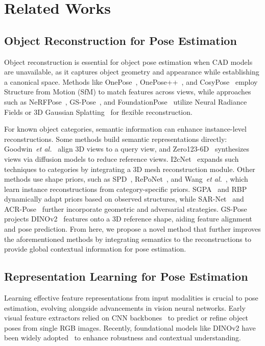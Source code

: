 \section{Related Works} \label{sec:related_works}
\subsection{Object Reconstruction for Pose Estimation}
Object reconstruction is essential for object pose estimation when CAD models are unavailable, as it captures object geometry and appearance while establishing a canonical space. Methods like OnePose~\cite{sun2022onepose}, OnePose++~\cite{he2022oneposeplusplus}, and CosyPose~\cite{labbe2020cosypose} employ Structure from Motion (SfM) to match features across views, while approaches such as NeRFPose~\cite{li2023nerf}, GS-Pose~\cite{cai2024gs}, and FoundationPose~\cite{wen2024foundationpose} utilize Neural Radiance Fields or 3D Gaussian Splatting~\cite{kerbl20233dgaussian} for flexible reconstruction.

For known object categories, semantic information can enhance instance-level reconstructions. Some methods build semantic representations directly: Goodwin~\textit{et al.}~\cite{goodwin2022zero} align 3D views to a query view, and Zero123-6D~\cite{di2024zero123} synthesizes views via diffusion models to reduce reference views. I2cNet~\cite{i2c} expands such techniques to categories by integrating a 3D mesh reconstruction module. Other methods use shape priors, such as SPD~\cite{tian2020shape}, RePoNet~\cite{fu2022category}, and Wang~\textit{et al.}~\cite{wang2021category}, which learn instance reconstructions from category-specific priors. SGPA~\cite{chen2021sgpa} and RBP~\cite{zhang2022rbp} dynamically adapt priors based on observed structures, while SAR-Net~\cite{sar} and ACR-Pose~\cite{fan2021acrpose} further incorporate geometric and adversarial strategies. GS-Pose~\cite{wang2025gs} projects DINOv2~\cite{oquab2023dinov2} features onto a 3D reference shape, aiding feature alignment and pose prediction. From here, we propose a novel method that further improves the aforementioned methods by integrating semantics to the reconstructions to provide global contextual information for pose estimation.

 
\subsection{Representation Learning for Pose Estimation}
Learning effective feature representations from input modalities is crucial to pose estimation, evolving alongside advancements in vision neural networks. Early visual feature extractors relied on CNN backbones~\cite{xiang2017posecnn,kehl2017ssd,sundermeyer2018implicit,peng2019pvnet,zakharov2019dpod,labbe2022megapose} to predict or refine object poses from single RGB images. Recently, foundational models like DINOv2 have been widely adopted~\cite{nguyen2024gigapose,ornek2025foundpose,ausserlechner2024zs6d,chen2024secondpose,lin2024sam} to enhance robustness and contextual understanding.

